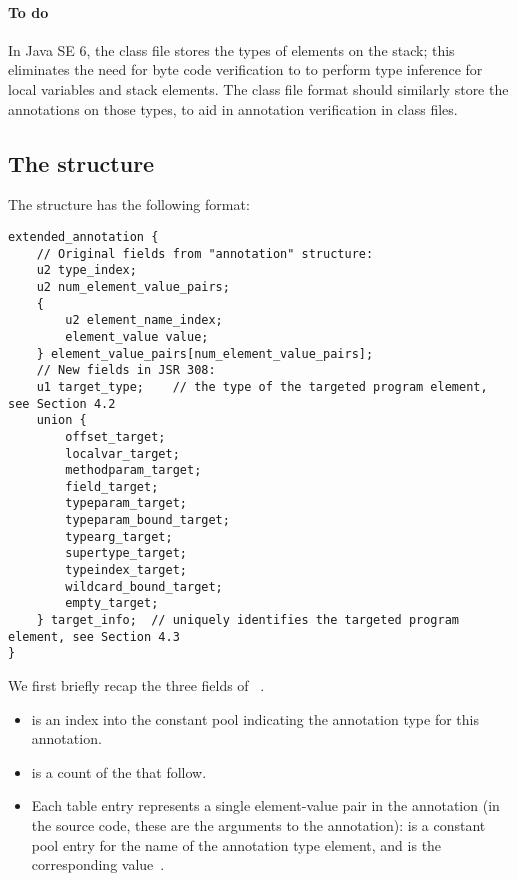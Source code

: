 \documentclass[10pt]{article}
\begin{document}
\paragraph{To do}
In Java SE 6, the class file stores the types of elements on the stack;
this eliminates the need for byte code verification to to perform type
inference for local variables and stack elements.  The class file format
should similarly store the annotations on those types, to aid in annotation
verification in class files.



\subsection{The  structure\label{class-file:ext}}

The \extendedannotation structure has the following format:

\begin{Verbatim}
extended_annotation {
    // Original fields from "annotation" structure:
    u2 type_index;
    u2 num_element_value_pairs;
    {
        u2 element_name_index;
        element_value value;
    } element_value_pairs[num_element_value_pairs];
    // New fields in JSR 308:
    u1 target_type;    // the type of the targeted program element, see Section 4.2
    union {
        offset_target;
        localvar_target;
        methodparam_target;
        field_target;
        typeparam_target;
        typeparam_bound_target;
        typearg_target;
        supertype_target;
        typeindex_target;
        wildcard_bound_target;
        empty_target;
    } target_info;  // uniquely identifies the targeted program element, see Section 4.3
}
\end{Verbatim}

We first briefly recap
the three fields of ~\cite[\S 4.8.15]{LindholmY99:CFF5}.

\begin{itemize}
\item {} is an index into the constant pool indicating the
  annotation type for this annotation.
\item {} is a count of the
   that follow.
\item Each  table entry represents a single
  element-value pair in the annotation (in the source code, these are the
  arguments to the annotation):   is a
  constant pool entry for the name of the annotation type element, and
   is the corresponding value~\cite[\S 4.8.15.1]{LindholmY99:CFF5}.
\end{itemize}
\end{document}
